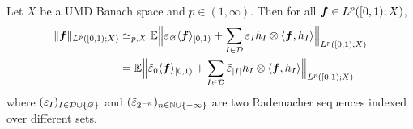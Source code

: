 \begin{prop}
  Let $X$ be a UMD Banach space and $p \in (1,\infty)$.
  Then for all $\bm{f} \in L^p([0,1);X)$,
  \begin{equation*}
    \begin{aligned}
    \|\bm{f}\|_{L^p([0,1);X)}
    &\simeq_{p,X} \mathbb{E} \Big\| \varepsilon_{\varnothing} \langle \bm{f} \rangle_{[0,1)} +  \sum_{I \in \mathcal{D}} \varepsilon_{I} h_{I} \otimes \langle \bm{f}, h_{I} \rangle \Big\|_{L^p([0,1);X)} \\
    &= \mathbb{E} \Big\| \tilde{\varepsilon}_{0} \langle \bm{f} \rangle_{[0,1)} + \sum_{I \in \mathcal{D}} \tilde{\varepsilon}_{|I|} h_{I} \otimes \langle \bm{f}, h_{I} \rangle \Big\|_{L^p([0,1);X)}
  \end{aligned}
\end{equation*}
where $(\varepsilon_{I})_{I \in \mathcal{D} \cup \{\varnothing\}}$ and $(\tilde{\varepsilon}_{2^{-n}})_{n \in \mathbb{N} \cup \{-\infty\}}$ are two Rademacher sequences indexed over different sets.
\end{prop}

